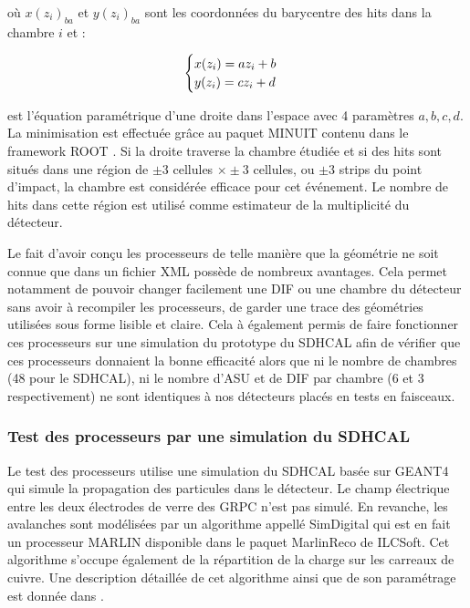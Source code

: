 \begin{itemize}[label=$\bullet$]
	où $x(z_{i})_{ba}$ et $y(z_{i})_{ba}$ sont les coordonnées du barycentre des hits dans la chambre $i$ et :
	
\begin{equation}
\begin{cases}
\strut x(z_i)=az_i+b\\
y(z_i)=cz_i+d
\end{cases}
\end{equation}

est l'équation paramétrique d'une droite dans l'espace avec \num{4} paramètres $a,b,c,d$. La minimisation est effectuée grâce au paquet MINUIT \cite{James:2004xla} contenu dans le framework ROOT \cite{BRUN199781}.
Si la droite traverse la chambre étudiée et si des hits sont situés dans une région de $\pm 3$ cellules $\times\pm 3$ cellules, ou $\pm 3$ strips du point d'impact, la chambre est considérée efficace pour cet événement. Le nombre de hits dans cette région est utilisé comme estimateur de la multiplicité du détecteur.
\end{itemize}

Le fait d'avoir conçu les processeurs de telle manière que la géométrie ne soit connue que dans un fichier XML possède de nombreux avantages. Cela permet notamment de pouvoir changer facilement une DIF ou une chambre du détecteur sans avoir à recompiler les processeurs, de garder une trace des géométries utilisées sous forme lisible et claire. Cela à également permis de faire fonctionner ces processeurs sur une simulation du prototype du SDHCAL afin de vérifier que ces processeurs donnaient la bonne efficacité alors que ni le nombre de chambres (48 pour le SDHCAL), ni le nombre d'ASU et de DIF par chambre (6 et 3 respectivement) ne sont identiques à nos détecteurs placés en tests en faisceaux.

\subsubsection{Test des processeurs par une simulation du SDHCAL}
Le test des processeurs utilise une simulation du SDHCAL basée sur GEANT4\cite{AGOSTINELLI2003250} qui simule la propagation des particules dans le détecteur. Le champ électrique entre les deux électrodes de verre des GRPC n'est pas simulé. En revanche, les avalanches sont modélisées par un algorithme appellé SimDigital qui est en fait un processeur MARLIN disponible dans le paquet MarlinReco \cite{2007Prama} de ILCSoft. Cet algorithme s'occupe également de la répartition de la charge sur les carreaux de cuivre. Une description détaillée de cet algorithme ainsi que de son paramétrage est donnée dans \cite{steen:tel-01282680}.

